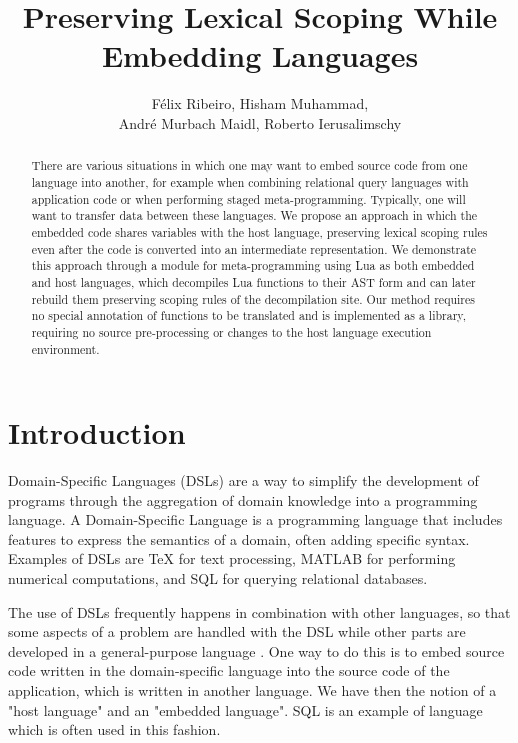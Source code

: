 \documentclass[english]{llncs}
\title{Preserving Lexical Scoping While Embedding Languages}
\author{
Félix Ribeiro,
Hisham Muhammad,\\
André Murbach Maidl,
Roberto Ierusalimschy
}
\institute{
Department of Computer Science --
PUC-Rio -- Rio de Janeiro -- Brazil
\email{\{fribeiro,hisham,amaidl,roberto\}@inf.puc-rio.br}
}
\begin{document}
\maketitle

\begin{abstract}

There are various situations in which one may want to embed source code from
one language into another, for example when combining relational query
languages with application code or when performing staged meta-programming.
Typically, one will want to transfer data between these languages.
We propose an approach in which the embedded code shares variables with the
host language, preserving lexical scoping rules even after the code is
converted into an intermediate representation. We demonstrate this approach
through a module for meta-programming using Lua as both embedded and host
languages, which decompiles Lua functions to their AST form and can later
rebuild them preserving scoping rules of the decompilation site. Our method
requires no special annotation of functions to be translated and is
implemented as a library, requiring no source pre-processing or changes to
the host language execution environment.

\end{abstract}

\section{Introduction}
\label{sec:introduction}

Domain-Specific Languages (DSLs) are a way to simplify the development
of programs through the aggregation of domain knowledge into a
programming language.
A Domain-Specific Language is a programming language that
includes features to express the semantics of a domain,
often adding specific syntax.
Examples of DSLs are \TeX{} for text processing, MATLAB for performing
numerical computations, and SQL for querying relational databases.

The use of DSLs frequently happens in combination with other languages, so
that some aspects of a problem are handled with the DSL while other parts are
developed in a general-purpose language \cite{Fowler:2010:DSL:1809745}. One
way to do this is to embed source code written in the domain-specific language
into the source code of the application, which is written in another language.
We have then the notion of a "host language" and an "embedded language". SQL
is an example of language which is often used in this fashion.
\end{document}
